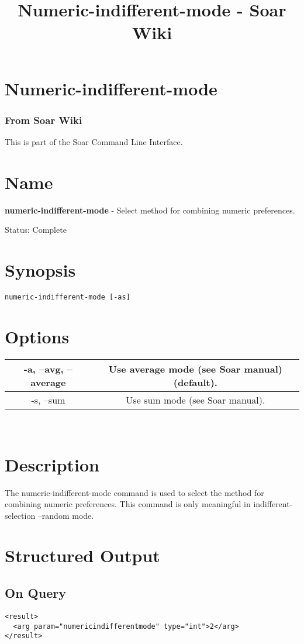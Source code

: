 \documentclass[10pt]{article}
\title{Numeric-indifferent-mode - Soar Wiki}
\begin{document}
\section*{Numeric-indifferent-mode}
\subsubsection*{From Soar Wiki}


 This is part of the Soar Command Line Interface. 
\section*{ Name }


 \textbf{numeric-indifferent-mode}
 - Select method for combining numeric preferences. 


 Status: Complete
\section*{ Synopsis }
\begin{verbatim}
numeric-indifferent-mode [-as]

\end{verbatim}
\section*{ Options }


\begin{tabular}{|c|c|}
\hline 
 -a, --avg, --average  & Use average mode (see Soar manual) (default).  \\
 \hline 
 -s, --sum  & Use sum mode (see Soar manual).  \\
 \hline 

\end{tabular}



 \\ 

\section*{ Description }


 The numeric-indifferent-mode command is used to select the method for combining numeric preferences. This command is only meaningful in indifferent-selection --random  mode. 
\section*{ Structured Output }
\subsection*{ On Query }
\begin{verbatim}
<result>
  <arg param="numericindifferentmode" type="int">2</arg>
</result>

\end{verbatim}
\end{document}
